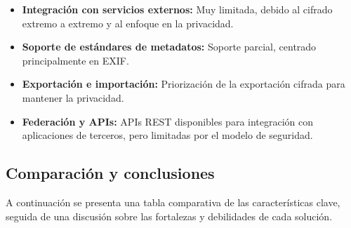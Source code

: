 \begin{itemize}
    \item \textbf{Integración con servicios externos:} Muy limitada, debido al cifrado extremo a extremo y al enfoque en la privacidad.
    \item \textbf{Soporte de estándares de metadatos:} Soporte parcial, centrado principalmente en EXIF.
    \item \textbf{Exportación e importación:} Priorización de la exportación cifrada para mantener la privacidad.
    \item \textbf{Federación y APIs:} APIs REST disponibles para integración con aplicaciones de terceros, pero limitadas por el modelo de seguridad.
\end{itemize}

\subsection{Comparación y conclusiones}

A continuación se presenta una tabla comparativa de las características clave, seguida de una discusión sobre las fortalezas y debilidades de cada solución.

\begin{table}[h!]
\centering
\label{tab:comparativa}
\caption{Tabla Comparativa de Características Clave.}
\end{table}

